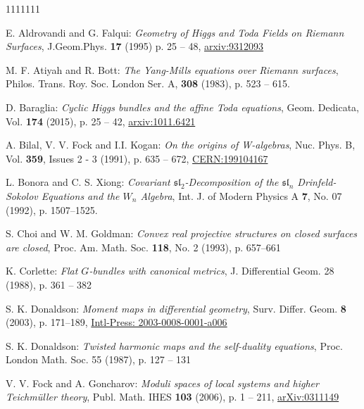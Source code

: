 \documentclass[11pt]{amsart}
\numberwithin{thm}{section} %
\numberwithin{equation}{section} %
\numberwithin{figure}{section} %
\begin{document}
\begin{thebibliography}{1111111}

E. Aldrovandi and G. Falqui: \textit{Geometry of Higgs and Toda Fields on Riemann Surfaces}, J.Geom.Phys. \textbf{17} (1995) p. 25 -- 48, \href{https://arxiv.org/abs/hep-th/9312093}{arxiv:9312093}

M. F. Atiyah and R. Bott: \textit{The Yang-Mills equations over Riemann surfaces}, Philos. Trans. Roy. Soc. London Ser. A, \textbf{308} (1983), p. 523 -- 615.

D. Baraglia: \textit{Cyclic Higgs bundles and the affine Toda equations}, Geom. Dedicata, Vol. \textbf{174} (2015), p. 25 -- 42, \href{https://arxiv.org/abs/1011.6421}{arxiv:1011.6421}

A. Bilal, V. V. Fock and I.I. Kogan: \textit{On the origins of W-algebras}, Nuc. Phys. B, Vol. \textbf{359}, Issues 2 - 3 (1991), p. 635 -- 672, \href{http://cds.cern.ch/record/217043/files/199104167.pdf}{CERN:199104167}

L. Bonora and C. S. Xiong: \textit{Covariant $\mathfrak{sl}_2$-Decomposition of the $\mathfrak{sl}_n$ Drinfeld-Sokolov Equations and the $W_n$ Algebra}, Int. J. of Modern Physics A \textbf{7}, No. 07 (1992), p. 1507--1525.

S. Choi and W. M. Goldman: \textit{Convex real projective structures on closed surfaces are closed}, Proc. Am. Math. Soc. \textbf{118}, No. 2 (1993), p. 657--661

K. Corlette: \textit{Flat $G$-bundles with canonical metrics}, J. Differential Geom. 28 (1988), p. 361 – 382

S. K. Donaldson: \textit{Moment maps in differential geometry}, Surv. Differ. Geom. \textbf{8} (2003), p. 171--189, \href{https://www.intlpress.com/site/pub/files/_fulltext/journals/sdg/2003/0008/0001/SDG-2003-0008-0001-a006.pdf}{Intl-Press: 2003-0008-0001-a006}

S. K. Donaldson: \textit{Twisted harmonic maps and the self-duality equations}, Proc. London Math. Soc. 55 (1987), p. 127 – 131


V. V. Fock and A. Goncharov: \textit{Moduli spaces of local systems and higher Teichm\"uller theory}, Publ. Math. IHES \textbf{103} (2006), p. 1 -- 211, \href{https://arxiv.org/pdf/math/0311149.pdf}{arXiv:0311149}


\end{thebibliography}
\end{document}
